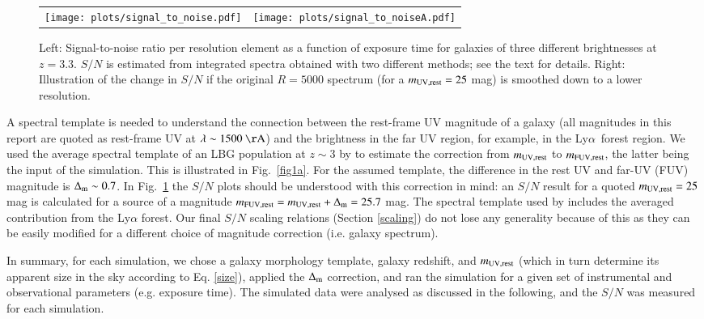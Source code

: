 \documentclass{aa}
\newcommand{\lya}{Ly$\alpha$}
\begin{document}
\begin{figure*}
\begin{center}
\begin{tabular}{cc}
\texttt{[image: plots/signal\_to\_noise.pdf]}&
\texttt{[image: plots/signal\_to\_noiseA.pdf]}
\end{tabular}
\caption{Left: Signal-to-noise ratio per resolution element as a function of exposure time for galaxies of three different brightnesses at $z=3.3$. $S/N$ is estimated from integrated spectra obtained with two different methods; see the text for details. Right: Illustration of the change in $S/N$ if the original $R=5000$ spectrum (for a $m_{\rm UV,rest} = 25$ mag) is smoothed down to a lower resolution.}
\label{fig2}
\end{center}
\end{figure*}

A spectral template is needed to understand the connection between the rest-frame UV magnitude of a galaxy (all magnitudes in this report are quoted as rest-frame UV at $\lambda \sim 1500~\mathrm{\AA}$) and the brightness in the far UV region, for example, in the \lya\, forest region. We used the average spectral template of an LBG population at $z \sim 3$ by \citet{Shapley2003} to estimate the correction from $m_{\rm UV,rest}$ to $m_{\rm FUV,rest}$, the latter being the input of the simulation. This is illustrated in Fig.~\ref{fig1a}. For the assumed \citet{Shapley2003} template, the difference in the rest UV and far-UV (FUV) magnitude is $\Delta_{\rm m} \sim 0.7$. In Fig.~\ref{fig2} the $S/N$ plots should be understood with this correction in mind: an $S/N$ result for a quoted $m_{\rm UV,rest}=25$ mag is calculated for a source of a magnitude $m_{\rm FUV,rest} = m_{\rm UV,rest} + \Delta_{\rm m} = 25.7$ mag. The spectral template used by \citet{Shapley2003} includes the averaged contribution from the Ly$\alpha$ forest. Our final $S/N$ scaling relations (Section \ref{scaling}) do not lose any generality because of this as they can be easily modified for a different choice of magnitude correction (i.e. galaxy spectrum).

In summary, for each simulation, we chose a galaxy morphology template, galaxy redshift, and $m_{\rm UV,rest}$ (which in turn determine its apparent size in the sky according to Eq. \ref{size}), applied the $\Delta_{\rm m}$ correction, and ran the simulation for a given set of instrumental and observational parameters (e.g. exposure time). The simulated data were analysed as discussed in the following, and the $S/N$ was measured for each simulation.
\end{document}
